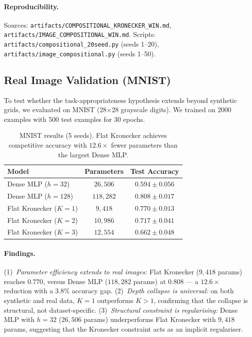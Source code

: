 \documentclass[11pt,a4paper]{article}
\begin{document}
\paragraph{Reproducibility.}
Sources: \texttt{artifacts/COMPOSITIONAL\_KRONECKER\_WIN.md},
\texttt{artifacts/IMAGE\_COMPOSITIONAL\_WIN.md}.
Scripts: \texttt{artifacts/compositional\_20seed.py} (seeds 1--20),
\texttt{artifacts/image\_compositional.py} (seeds 1--50).


\subsection{Real Image Validation (MNIST)}
\label{sec:mnist}

To test whether the task-appropriateness hypothesis extends beyond
synthetic grids, we evaluated on MNIST (28$\times$28 grayscale digits).
We trained on 2000 examples with 500 test examples for 30 epochs.

\begin{table}[h]
\centering
\caption{MNIST results (5 seeds). Flat Kronecker achieves competitive
accuracy with $12.6\times$ fewer parameters than the largest Dense MLP.}
\label{tab:mnist}
\small
\begin{tabular}{lcc}
\toprule
Model & Parameters & Test Accuracy \\
\midrule
Dense MLP ($h=32$)         & $26{,}506$  & $0.594 \pm 0.056$ \\
Dense MLP ($h=128$)        & $118{,}282$ & $0.808 \pm 0.017$ \\
Flat Kronecker ($K=1$)     & $9{,}418$   & $0.770 \pm 0.013$ \\
Flat Kronecker ($K=2$)     & $10{,}986$  & $0.717 \pm 0.041$ \\
Flat Kronecker ($K=3$)     & $12{,}554$  & $0.662 \pm 0.048$ \\
\bottomrule
\end{tabular}
\end{table}

\paragraph{Findings.}
(1)~\emph{Parameter efficiency extends to real images:} Flat
Kronecker ($9{,}418$ params) reaches $0.770$, versus Dense MLP
($118{,}282$ params) at $0.808$ --- a $12.6\times$ reduction with a
$3.8\%$ accuracy gap.
(2)~\emph{Depth collapse is universal:} on both synthetic and real
data, $K=1$ outperforms $K>1$, confirming that the collapse is
structural, not dataset-specific.
(3)~\emph{Structural constraint is regularising:} Dense MLP with
$h=32$ ($26{,}506$ params) underperforms Flat Kronecker with
$9{,}418$ params, suggesting that the Kronecker constraint acts as
an implicit regulariser.
\end{document}
